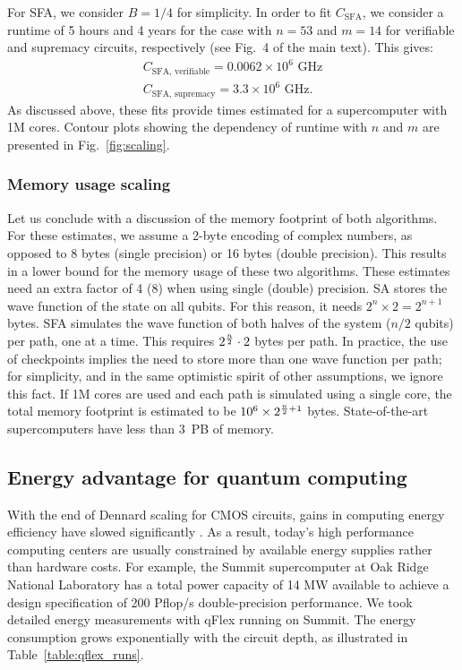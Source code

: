 For SFA, we consider $B=1/4$ for simplicity. In order to fit $C_{\text{SFA}}$, we consider a runtime of 5 hours and 4 years for the case with $n=53$ and $m=14$ for verifiable and supremacy circuits, respectively (see Fig.~4 of the main text). This gives:
\begin{align}
\label{eq:fit_sfa}
    C_{\text{SFA, verifiable}} = 0.0062 \times 10^{6} \text{ GHz} \nonumber \\
    C_{\text{SFA, supremacy}} = 3.3 \times 10^{6} \text{ GHz.}
\end{align}
As discussed above, these fits provide times estimated for a supercomputer with 1M cores. Contour plots showing the dependency of runtime with $n$ and $m$ are presented in Fig.~\ref{fig:scaling}. 


\subsubsection{Memory usage scaling}
\label{subsec:memory}

Let us conclude with a discussion of the memory footprint of both algorithms. For these estimates, we assume a 2-byte encoding of complex numbers, as opposed to 8 bytes (single precision) or 16 bytes (double precision). This results in a lower bound for the memory usage of these two algorithms. These estimates need an extra factor of 4 (8) when using single (double) precision. SA stores the wave function of the state on all qubits. For this reason, it needs $2^n \times 2 = 2^{n+1}$ bytes. SFA simulates the wave function of both halves of the system ($n/2$ qubits) per path, one at a time. This requires $2^{n\over 2} \cdot 2$ bytes per path. In practice, the use of checkpoints implies the need to store more than one wave function per path; for simplicity, and in the same optimistic spirit of other assumptions, we ignore this fact. If 1M cores are used and each path is simulated using a single core, the total memory footprint is estimated to be $10^{6} \times 2^{{n\over 2} + 1}$ bytes. State-of-the-art supercomputers have less than 3~PB of memory.


\subsection{Energy advantage for quantum computing}
\label{sec:energy_advantage}

With the end of Dennard scaling for CMOS circuits, gains in computing energy efficiency have slowed significantly \cite{koomey2016}.  As a result, today's high performance computing centers are usually constrained by available energy supplies rather than hardware costs. For example, the Summit supercomputer at Oak Ridge National Laboratory has a total power capacity of 14 MW available to achieve a design specification of 200 Pflop/s double-precision performance.  We took detailed energy measurements with qFlex running on Summit. The energy consumption grows exponentially with the circuit depth, as illustrated in Table~\ref{table:qflex_runs}.


